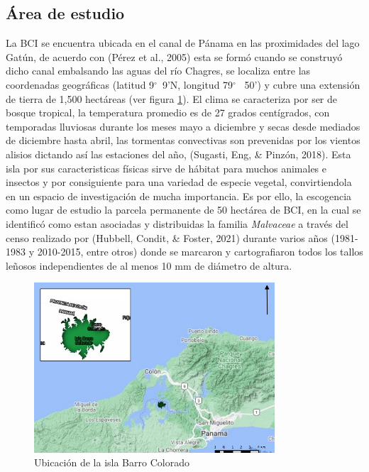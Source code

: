 \documentclass[11pt,]{article}
\begin{document}
\subsection{Área de estudio}\label{uxe1rea-de-estudio}

La BCI se encuentra ubicada en el canal de Pánama en las proximidades
del lago Gatún, de acuerdo con (Pérez et al., 2005) esta se formó cuando
se construyó dicho canal embalsando las aguas del río Chagres, se
localiza entre las coordenadas geográficas (latitud 9\(^\circ\)~9'N,
longitud 79\(^\circ\)~ 50') y cubre una extensión de tierra de 1,500
hectáreas (ver figura \ref{mapa}). El clima se caracteriza por ser de
bosque tropical, la temperatura promedio es de 27 grados centígrados,
con temporadas lluviosas durante los meses mayo a diciembre y secas
desde mediados de diciembre hasta abril, las tormentas convectivas son
prevenidas por los vientos alisios dictando así las estaciones del año,
(Sugasti, Eng, \& Pinzón, 2018). Esta isla por sus caracteristicas
físicas sirve de hábitat para muchos animales e insectos y por
consiguiente para una variedad de especie vegetal, convirtiendola en un
espacio de investigación de mucha importancia. Es por ello, la
escogencia como lugar de estudio la parcela permanente de 50 hectárea de
BCI, en la cual se identificó como estan asociadas y distribuidas la
familia \emph{Malvaceae} a través del censo realizado por (Hubbell,
Condit, \& Foster, 2021) durante varios años (1981-1983 y 2010-2015,
entre otros) donde se marcaron y cartografiaron todos los tallos leñosos
independientes de al menos 10 mm de diámetro de altura.

\begin{figure}
\centering
\includegraphics[width=0.80000\textwidth]{mapa_barro_colorado.jpeg}
\caption{Ubicación de la isla Barro Colorado\label{mapa}}
\end{figure}
\end{document}
